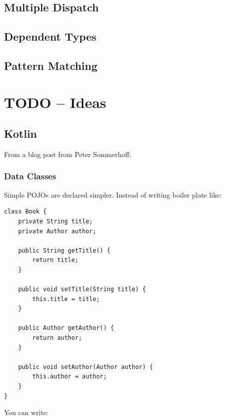 \documentclass[11pt, a4paper]{report}
\begin{document}

\section{Multiple Dispatch}


\section{Dependent Types}


\section{Pattern Matching}


\chapter{TODO -- Ideas}

\section{Kotlin}

From a blog post from Peter Sommerhoff\cite{kotlin-sommerhoff}:

\subsection{Data Classes}

Simple POJOs are declared simpler. Instead of writing boiler plate like:

\begin{lstlisting}
class Book {
    private String title;
    private Author author;

    public String getTitle() {
        return title;
    }
    
    public void setTitle(String title) {
        this.title = title;
    }

    public Author getAuthor() {
        return author;
    }
    
    public void setAuthor(Author author) {
        this.author = author;
    }
}
\end{lstlisting}

You can write:
\end{document}
